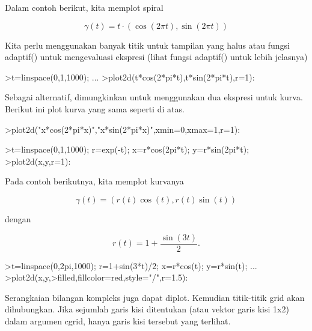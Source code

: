 \documentclass{article}
\begin{document}
\begin{eulernotebook}
\begin{eulercomment}
\begin{eulercomment}
\begin{eulercomment}
\begin{eulercomment}
\begin{eulercomment}
Dalam contoh berikut, kita memplot spiral

\end{eulercomment}
\begin{eulerformula}
\[
\gamma(t) = t \cdot (\cos(2\pi t),\sin(2\pi t))
\]
\end{eulerformula}
\begin{eulercomment}
Kita perlu menggunakan banyak titik untuk tampilan yang halus atau
fungsi adaptif() untuk mengevaluasi ekspresi (lihat fungsi adaptif()
untuk lebih jelasnya)
\end{eulercomment}
\begin{eulerprompt}
>t=linspace(0,1,1000); ...
>plot2d(t*cos(2*pi*t),t*sin(2*pi*t),r=1):
\end{eulerprompt}
\begin{eulercomment}
Sebagai alternatif, dimungkinkan untuk menggunakan dua ekspresi untuk
kurva. Berikut ini plot kurva yang sama seperti di atas.
\end{eulercomment}
\begin{eulerprompt}
>plot2d("x*cos(2*pi*x)","x*sin(2*pi*x)",xmin=0,xmax=1,r=1):
\end{eulerprompt}
\begin{eulerprompt}
>t=linspace(0,1,1000); r=exp(-t); x=r*cos(2pi*t); y=r*sin(2pi*t);
>plot2d(x,y,r=1):
\end{eulerprompt}
\begin{eulercomment}
Pada contoh berikutnya, kita memplot kurvanya

\end{eulercomment}
\begin{eulerformula}
\[
\gamma(t) = (r(t) \cos(t), r(t) \sin(t))
\]
\end{eulerformula}
\begin{eulercomment}
dengan

\end{eulercomment}
\begin{eulerformula}
\[
r(t) = 1 + \dfrac{\sin(3t)}{2}.
\]
\end{eulerformula}
\begin{eulerprompt}
>t=linspace(0,2pi,1000); r=1+sin(3*t)/2; x=r*cos(t); y=r*sin(t); ...
>plot2d(x,y,>filled,fillcolor=red,style="/",r=1.5):
\end{eulerprompt}
\begin{eulercomment}
Serangkaian bilangan kompleks juga dapat diplot. Kemudian titik-titik
grid akan dihubungkan. Jika sejumlah garis kisi ditentukan (atau
vektor garis kisi 1x2) dalam argumen cgrid, hanya garis kisi tersebut
yang terlihat.


\end{eulercomment}
\end{eulercomment}
\end{eulercomment}
\end{eulercomment}
\end{eulercomment}
\end{eulernotebook}
\end{document}
